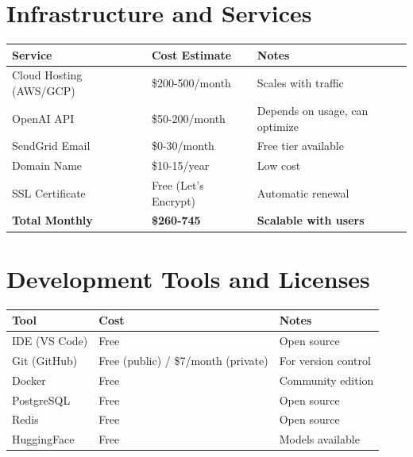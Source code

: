 \documentclass[12pt,oneside]{report}
\begin{document}
\section{Infrastructure and Services}

\begin{table}[h]
\centering
\begin{tabular}{|l|l|l|}
\hline
\rowcolor{lightblue}
\textbf{Service} & \textbf{Cost Estimate} & \textbf{Notes} \\
\hline
Cloud Hosting (AWS/GCP) & \$200-500/month & Scales with traffic \\
\hline
OpenAI API & \$50-200/month & Depends on usage, can optimize \\
\hline
SendGrid Email & \$0-30/month & Free tier available \\
\hline
Domain Name & \$10-15/year & Low cost \\
\hline
SSL Certificate & Free (Let's Encrypt) & Automatic renewal \\
\hline
\textbf{Total Monthly} & \textbf{\$260-745} & \textbf{Scalable with users} \\
\hline
\end{tabular}
\end{table}

\section{Development Tools and Licenses}

\begin{table}[h]
\centering
\begin{tabular}{|l|l|l|}
\hline
\rowcolor{lightblue}
\textbf{Tool} & \textbf{Cost} & \textbf{Notes} \\
\hline
IDE (VS Code) & Free & Open source \\
\hline
Git (GitHub) & Free (public) / \$7/month (private) & For version control \\
\hline
Docker & Free & Community edition \\
\hline
PostgreSQL & Free & Open source \\
\hline
Redis & Free & Open source \\
\hline
HuggingFace & Free & Models available \\
\hline
\end{tabular}
\end{table}

\end{document}
